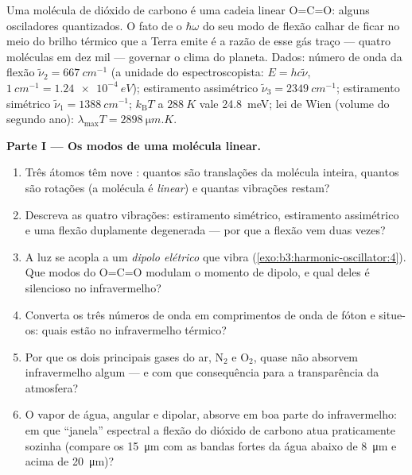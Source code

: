 \begin{problem}\label{pb:b3:harmonic-oscillator:1}
Uma molécula de dióxido de carbono é uma cadeia linear O=C=O: alguns
osciladores quantizados. O fato de o $\hbar\omega$ do seu modo de
flexão calhar de ficar no meio do brilho térmico que a Terra emite é a
razão de esse gás traço --- quatro moléculas em dez mil --- governar o
clima do planeta. Dados: número de onda da flexão
$\tilde\nu_2 = \qty{667}{cm^{-1}}$ (a unidade do espectroscopista:
$E = hc\tilde\nu$, $\qty{1}{cm^{-1}} =
\qty{1.24e-4}{eV}$); estiramento assimétrico $\tilde\nu_3 =
\qty{2349}{cm^{-1}}$; estiramento simétrico $\tilde\nu_1 =
\qty{1388}{cm^{-1}}$; $k_{\text{B}}T$ a $\qty{288}{K}$ vale
\qty{24.8}{meV}; lei de Wien (volume do segundo ano): $\lambda_{\max}T =
\qty{2898}{\micro m.K}$.

\medskip\noindent\textbf{Parte I --- Os modos de uma molécula linear.}
\begin{enumerate}
  \item Três átomos têm nove : quantos são
        translações da molécula inteira, quantos são rotações (a
        molécula é \emph{linear}) e quantas vibrações restam?
  \item Descreva as quatro vibrações: estiramento simétrico,
        estiramento assimétrico e uma flexão duplamente degenerada ---
        por que a flexão vem duas vezes?
  \item A luz se acopla a um \emph{dipolo elétrico} que vibra
        (\cref{exo:b3:harmonic-oscillator:4}). Que modos do
        O=C=O modulam o momento de dipolo, e qual deles é silencioso
        no infravermelho?
  \item Converta os três números de onda em comprimentos de onda de
        fóton e situe-os: quais estão no infravermelho térmico?
  \item Por que os dois principais gases do ar, N$_2$ e O$_2$, quase
        não absorvem infravermelho algum --- e com que consequência
        para a transparência da atmosfera?
  \item O vapor de água, angular e dipolar, absorve em boa parte do
        infravermelho: em que ``janela'' espectral a flexão do dióxido
        de carbono atua praticamente sozinha (compare os
        \qty{15}{\micro m} com as bandas fortes da água abaixo de
        \qty{8}{\micro m} e acima de \qty{20}{\micro m})?
\end{enumerate}


\end{problem}
